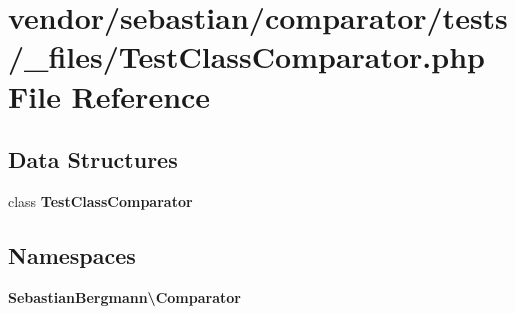 \section{vendor/sebastian/comparator/tests/\+\_\+files/\+Test\+Class\+Comparator.php File Reference}
\label{_test_class_comparator_8php}
\subsection*{Data Structures}
\begin{DoxyCompactItemize}
\item 
class {\bf Test\+Class\+Comparator}
\end{DoxyCompactItemize}
\subsection*{Namespaces}
\begin{DoxyCompactItemize}
\item 
 {\bf Sebastian\+Bergmann\textbackslash{}\+Comparator}
\end{DoxyCompactItemize}
